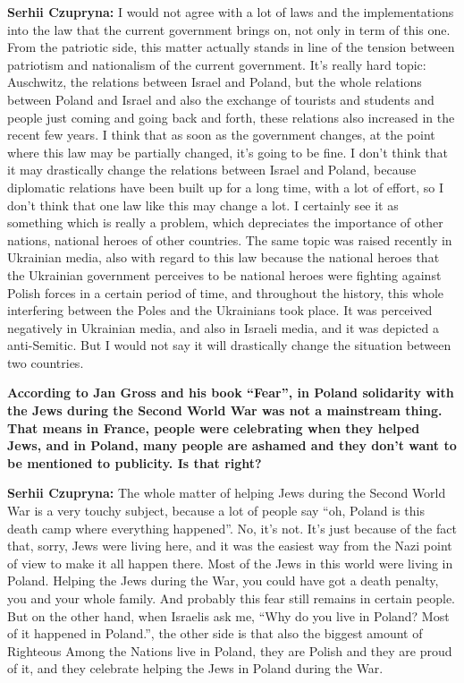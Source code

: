 \textbf{Serhii Czupryna:} I would not agree with a lot of laws and the implementations into the law that the current government brings on, not only in term of this one. From the patriotic side, this matter actually stands in line of the tension between patriotism and nationalism of the current government. It’s really hard topic: Auschwitz, the relations between Israel and Poland, but the whole relations between Poland and Israel and also the exchange of tourists and students and people just coming and going back and forth, these relations also increased in the recent few years. I think that as soon as the government changes, at the point where this law may be partially changed, it’s going to be fine. I don’t think that it may drastically change the relations between Israel and Poland, because diplomatic relations have been built up for a long time, with a lot of effort, so I don’t think that one law like this may change a lot. I certainly see it as something which is really a problem, which depreciates the importance of other nations, national heroes of other countries. The same topic was raised recently in Ukrainian media, also with regard to this law because the national heroes that the Ukrainian government perceives to be national heroes were fighting against Polish forces in a certain period of time, and throughout the history, this whole interfering between the Poles and the Ukrainians took place. It was perceived negatively in Ukrainian media, and also in Israeli media, and it was depicted a anti-Semitic. But I would not say it will drastically change the situation between two countries.\par
\textbf{According to Jan Gross and his book ``Fear'', in Poland solidarity with the Jews during the Second World War was not a mainstream thing. That means in France, people were celebrating when they helped Jews, and in Poland, many people are ashamed and they don’t want to be mentioned to publicity. Is that right?}\par
\textbf{Serhii Czupryna:} The whole matter of helping Jews during the Second World War is a very touchy subject, because a lot of people say “oh, Poland is this death camp where everything happened”. No, it’s not. It’s just because of the fact that, sorry, Jews were living here, and it was the easiest way from the Nazi point of view to make it all happen there. Most of the Jews in this world were living in Poland. Helping the Jews during the War, you could have got a death penalty, you and your whole family. And probably this fear still remains in certain people. But on the other hand, when Israelis ask me, “Why do you live in Poland? Most of it happened in Poland.”, the other side is that also the biggest amount of Righteous Among the Nations live in Poland, they are Polish and they are proud of it, and they celebrate helping the Jews in Poland during the War.\par
